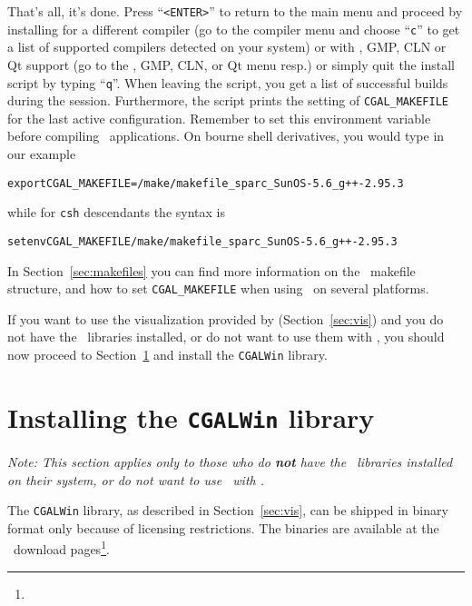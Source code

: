 That's all, it's done. Press ``\texttt{<ENTER>}'' to return to the
main menu and proceed by installing for a different compiler (go to
the compiler menu and choose ``\texttt{c}'' to get a list of supported
compilers detected on your system) or with \leda, GMP, CLN or Qt
support (go to the \leda, GMP, CLN, or Qt menu resp.) or simply quit
the install script by typing ``\texttt{q}''. When leaving the script,
you get a list of successful builds during the session. Furthermore,
the script prints the setting of \texttt{CGAL\_MAKEFILE} for the last
active configuration. Remember to set this environment variable before
compiling \cgal\ applications. On bourne shell derivatives, you would
type in our example
\begin{alltt}
      export CGAL_MAKEFILE=\cgaldir/make/makefile_sparc_SunOS-5.6_g++-2.95.3
\end{alltt}
while for \texttt{csh} descendants the syntax is
\begin{alltt}
      setenv CGAL_MAKEFILE \cgaldir/make/makefile_sparc_SunOS-5.6_g++-2.95.3
\end{alltt}
In Section~\ref{sec:makefiles} you can find more information on the
\cgal\ makefile structure, and how to set \texttt{CGAL\_MAKEFILE} when
using \cgal\ on several platforms.

If you want to use the visualization provided by
 (Section~\ref{sec:vis}) and you do not have
the \leda\ libraries installed, or do not want to use them with \cgal, 
you should now proceed to
Section~\ref{sec:cgalwin} and install the \texttt{CGALWin} library.


\section{Installing the \texttt{CGALWin} library}\label{sec:cgalwin}

\textit{Note: This section applies only to those who do \textbf{not}
  have the \leda\ libraries installed on their system, or do not want to
use \leda\ with \cgal.}

The \texttt{CGALWin} library, as described in Section~\ref{sec:vis},
can be shipped in binary format only because of licensing
restrictions. The binaries are available at the \cgal\ download
pages\footnote{\cgalwinlibpage}.

